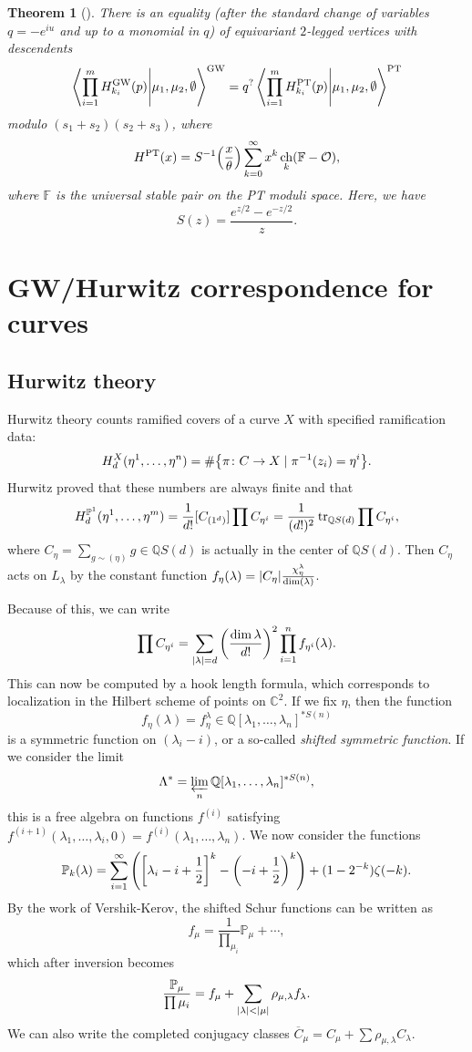 \documentclass[leqno, openany]{memoir}
\newtheorem{thm}{Theorem}[section]
\theoremstyle{definition}
\theoremstyle{remark}
\theoremstyle{plain}
\theoremstyle{definition}
\theoremstyle{remark}
\newcommand{\F}{\mathbb{F}}
\newcommand{\C}{\mathbb{C}}
\newcommand{\Q}{\mathbb{Q}}
\renewcommand{\P}{\mathbb{P}}
\newcommand{\mc}[1]{\mathcal{#1}}
\newcommand{\mr}[1]{\mathrm{#1}}
\DeclareMathOperator{\ch}{ch}
\begin{document}
\begin{thm}[{\autocite[Theorems 4, 5]{gwptdescendent}}]\label{thm:oopmain}
    There is an equality (after the standard change of variables $q=-e^{iu}$ and up to a monomial in $q$) of equivariant $2$-legged vertices with descendents
    \[ \braket{\prod_{i=1}^m H_{k_i}^{\mr{GW}}(p)}{\mu_1, \mu_2, \emptyset}^{\mr{GW}} = q^? \braket{\prod_{i=1}^m H_{k_i}^{\mr{PT}}(p)}{\mu_1, \mu_2, \emptyset}^{\mr{PT}} \]
    modulo $(s_1+s_2)(s_2+s_3)$, where
    \[ H^{\mr{PT}}(x) = S^{-1} \qty(\frac{x}{\theta}) \sum_{k=0}^{\infty} x^k \ch_k(\F-\mc{O}), \]
    where $\F$ is the universal stable pair on the PT moduli space. Here, we have
    \[ S(z) = \frac{e^{z/2}-e^{-z/2}}{z}. \]
\end{thm}

\section{GW/Hurwitz correspondence for curves}

\subsection{Hurwitz theory}\label{sub:hurwitz}

Hurwitz theory counts ramified covers of a curve $X$ with specified ramification data:
\[ H^X_d(\eta^1, \ldots, \eta^n) = \# \qty{\pi \colon C \to X \mid \pi^{-1}(z_i) = \eta^i}. \]
Hurwitz proved that these numbers are always finite and that
\[ H^{\P^1}_d(\eta^1, \ldots, \eta^m) = \frac{1}{d!} [C_{(1^d)}] \prod C_{\eta^i} = \frac{1}{(d!)^2} \tr_{\Q S(d)} \prod C_{\eta^i}, \]
where $C_{\eta} = \sum_{g \sim (\eta)} g \in \Q S(d)$ is actually in the center of $\Q S(d)$. Then $C_{\eta}$ acts on $L_{\lambda}$ by the constant function $f_{\eta}(\lambda) = \abs{C_{\eta}} \frac{\chi_{\eta}^{\lambda}}{\dim(\lambda)}$. 

Because of this, we can write
\[ \prod C_{\eta^i} = \sum_{\abs{\lambda} = d} \qty(\frac{\dim \lambda}{d!})^2 \prod_{i=1}^n f_{\eta^i}(\lambda). \]
This can now be computed by a hook length formula, which corresponds to localization in the Hilbert scheme of points on $\C^2$. If we fix $\eta$, then the function 
\[ f_{\eta}(\lambda) = f_{\eta}^{\lambda} \in \Q[\lambda_1, \ldots, \lambda_n]^{* S(n)} \]
is a symmetric function on $(\lambda_i - i)$, or a so-called \textit{shifted symmetric function}. If we consider the limit
\[ \Lambda^* = \varprojlim_{n} \Q[\lambda_1, \ldots, \lambda_n]^{*S(n)}, \]
this is a free algebra on functions $f^{(i)}$ satisfying $f^{(i+1)}(\lambda_1, \ldots, \lambda_i, 0) = f^{(i)}(\lambda_1, \ldots, \lambda_n)$. We now consider the functions
\[ \P_k(\lambda) = \sum_{i=1}^{\infty} \qty(\qty[\lambda_i - i + \frac{1}{2}]^k - \qty(-i + \frac{1}{2})^k) + (1-2^{-k}) \zeta(-k). \]
By the work of Vershik-Kerov, the shifted Schur functions can be written as 
\[ f_{\mu} = \frac{1}{\prod_{\mu_i}} \P_{\mu} + \cdots, \]
which after inversion becomes
\[ \frac{\P_{\mu}}{\prod \mu_i} = f_{\mu} + \sum_{\abs{\lambda} < \abs{\mu}} \rho_{\mu, \lambda} f_{\lambda}. \]
We can also write the completed conjugacy classes $\overline{C}_{\mu} = C_{\mu} + \sum \rho_{\mu, \lambda} C_{\lambda}$.
\end{document}
